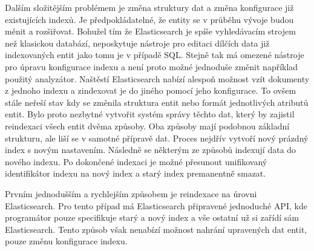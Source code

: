 		Dalším složitějším problémem je změna struktury dat a změna konfigurace již existujících indexů.
		Je předpokládatelné, že entity se v průběhu vývoje budou měnit a rozšiřovat.
		Bohužel tím že Elasticsearch je spíše vyhledávacím strojem než klasickou databází, neposkytuje nástroje pro editaci
		dílčích data již indexovaných entit jako tomu je v případě \ac{SQL}.
		Stejně tak má omezené nástroje pro úpravu konfigurace indexu a není proto možné jednoduše změnit například
		použitý analyzátor.
		Naštěstí Elasticsearch nabízí alespoň možnost vzít dokumenty z jednoho indexu a zindexovat je do jiného pomocí jeho
		konfigurace.
		To ovšem stále neřeší stav kdy se změnila struktura entit nebo formát jednotlivých atributů entit.
		Bylo proto nezbytné vytvořit systém správy těchto dat, který by zajistil reindexaci všech entit dvěma způsoby.
		Oba způsoby mají podobnou základní strukturu, ale liší se v samotné přípravě dat.
		Proces nejdřív vytvoří nový prázdný index s novým nastavením.
		Následně se některým ze způsobů indexují data do nového indexu.
		Po dokončené indexaci je možné přesunout unifikovaný identifikátor indexu na nový index a starý index premanentně
		smazat.

		Prvním jednodušším a rychlejším způsobem je reindexace na úrovni Elasticsearch.
		Pro tento případ má Elasticsearch připravené jednoduché \ac{API}, kde programátor pouze specifikuje starý a nový
		index a vše ostatní už si zařídí sám Elasticsearch.
		Tento způsob však nenabízí možnost nahrání upravených dat entit, pouze změnu konfigurace indexu.

